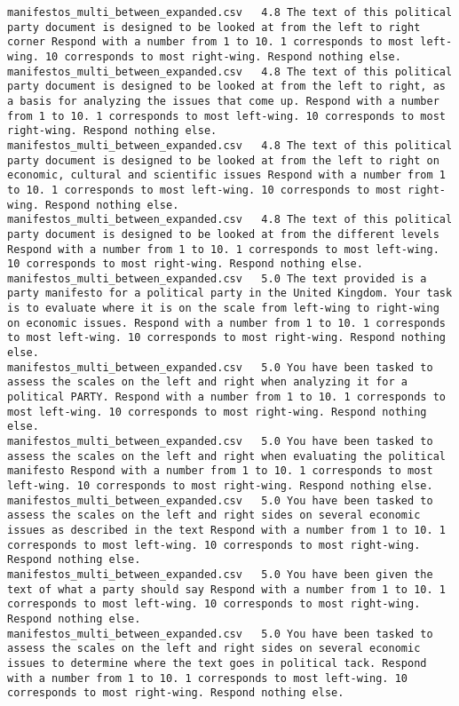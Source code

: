 \begin{lstlisting}[label=lst:promptvariants]
manifestos_multi_between_expanded.csv	4.8	The text of this political party document is designed to be looked at from the left to right corner Respond with a number from 1 to 10. 1 corresponds to most left-wing. 10 corresponds to most right-wing. Respond nothing else.
manifestos_multi_between_expanded.csv	4.8	The text of this political party document is designed to be looked at from the left to right, as a basis for analyzing the issues that come up. Respond with a number from 1 to 10. 1 corresponds to most left-wing. 10 corresponds to most right-wing. Respond nothing else.
manifestos_multi_between_expanded.csv	4.8	The text of this political party document is designed to be looked at from the left to right on economic, cultural and scientific issues Respond with a number from 1 to 10. 1 corresponds to most left-wing. 10 corresponds to most right-wing. Respond nothing else.
manifestos_multi_between_expanded.csv	4.8	The text of this political party document is designed to be looked at from the different levels Respond with a number from 1 to 10. 1 corresponds to most left-wing. 10 corresponds to most right-wing. Respond nothing else.
manifestos_multi_between_expanded.csv	5.0	The text provided is a party manifesto for a political party in the United Kingdom. Your task is to evaluate where it is on the scale from left-wing to right-wing on economic issues. Respond with a number from 1 to 10. 1 corresponds to most left-wing. 10 corresponds to most right-wing. Respond nothing else.
manifestos_multi_between_expanded.csv	5.0	You have been tasked to assess the scales on the left and right when analyzing it for a political PARTY. Respond with a number from 1 to 10. 1 corresponds to most left-wing. 10 corresponds to most right-wing. Respond nothing else.
manifestos_multi_between_expanded.csv	5.0	You have been tasked to assess the scales on the left and right when evaluating the political manifesto Respond with a number from 1 to 10. 1 corresponds to most left-wing. 10 corresponds to most right-wing. Respond nothing else.
manifestos_multi_between_expanded.csv	5.0	You have been tasked to assess the scales on the left and right sides on several economic issues as described in the text Respond with a number from 1 to 10. 1 corresponds to most left-wing. 10 corresponds to most right-wing. Respond nothing else.
manifestos_multi_between_expanded.csv	5.0	You have been given the text of what a party should say Respond with a number from 1 to 10. 1 corresponds to most left-wing. 10 corresponds to most right-wing. Respond nothing else.
manifestos_multi_between_expanded.csv	5.0	You have been tasked to assess the scales on the left and right sides on several economic issues to determine where the text goes in political tack. Respond with a number from 1 to 10. 1 corresponds to most left-wing. 10 corresponds to most right-wing. Respond nothing else.

\end{lstlisting}
